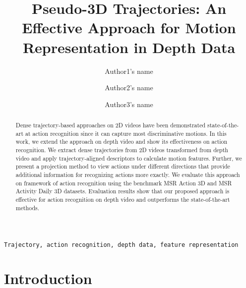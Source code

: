 \documentclass[review]{elsarticle}
\begin{document}
\begin{frontmatter}

\title{Pseudo-3D Trajectories: An Effective Approach for Motion Representation in Depth Data}




\author{Author1's name}
\address{Adress 1}

\author{Author2's name}
\address{Adress 2}

\author{Author3's name}
\address{Adress 3}


\begin{abstract}
Dense trajectory-based approaches on 2D videos have been demonstrated state-of-the-art at action recognition since it can capture most discriminative motions.
In this work, we extend the approach on depth video and show its effectiveness on action recognition.
We extract dense trajectories from 2D videos transformed from depth video and apply trajectory-aligned descriptors to calculate motion features.
Further, we present a projection method to view actions under different directions that provide additional information for recognizing actions more exactly.
We evaluate this approach on framework of action recognition using the benchmark MSR Action 3D and MSR Activity Daily 3D datasets.
Evaluation results show that our proposed approach is effective for action recognition on depth video and outperforms the state-of-the-art methods.
\end{abstract}

\begin{keyword}
\texttt{Trajectory, action recognition, depth data, feature representation}
\end{keyword}

\end{frontmatter}

\linenumbers

\section{Introduction}
\end{document}

